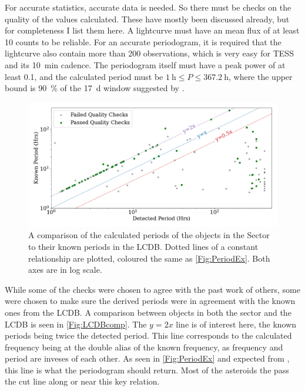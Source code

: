 \documentclass{UCreport}
\begin{document}
For accurate statistics, accurate data is needed.
So there must be checks on the quality of the values calculated.
These have mostly been discussed already, but for completeness I list them here.
A lightcurve must have an mean flux of at least 10 counts to be reliable.
For an accurate periodogram, it is required that the lightcurve also contain more than 200 observations, which is very easy for TESS and its \qty{10}{\minute} cadence.
The periodogram itself must have a peak power of at least 0.1, and the calculated period must be $\qty{1}{\hour}\leq P \leq \qty{367.2}{\hour}$, where the upper bound is \qty{90}{\percent} of the \qty{17}{\day} window suggested by \cite{McNeill2023}.
\begin{figure}[t]
  \centering
  \includegraphics[width=\textwidth]{../OzData/LCBDcompLogScaleLineText1.pdf}
  \caption[Known against calculated period]{A comparison of the calculated periods of the objects in the Sector to their known periods in the LCDB.
    Dotted lines of a constant relationship are plotted, coloured the same as \autoref{Fig:PeriodEx}.
    Both axes are in log scale.
  }

  \label{Fig:LCDBcomp}
\end{figure}
While some of the checks were chosen to agree with the past work of others, some were chosen to make sure the derived periods were in agreement with the known ones from the LCDB.
A comparison between objects in both the sector and the LCDB is seen in \autoref{Fig:LCDBcomp}.
The $y=2x$ line is of interest here, the known periods being twice the detected period.
This line corresponds to the calculated frequency being at the double alias of the known frequency, as frequency and period are inveses of each other.
As seen in \autoref{Fig:PeriodEx} and expected from \citet{McNeill2023}, this line is what the periodogram should return.
Most of the asteroids the pass the cut line along or near this key relation.
\end{document}
